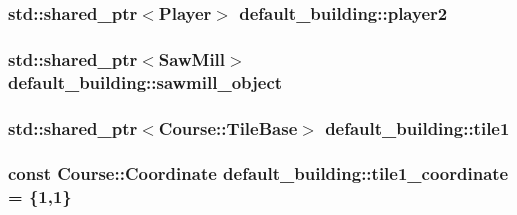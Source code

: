 \hypertarget{classdefault__building_a27f3d517ae073d9088c533a83a287ba5}{
\subsubsection[{player2}]{\setlength{\rightskip}{0pt plus 5cm}std\-::shared\-\_\-ptr$<${\bf Player}$>$ default\-\_\-building\-::player2\hspace{0.3cm}{\ttfamily [private]}}}\label{classdefault__building_a27f3d517ae073d9088c533a83a287ba5}
\hypertarget{classdefault__building_a17f72da13e6159671242ad6e31ba7fb0}{
\subsubsection[{sawmill\-\_\-object}]{\setlength{\rightskip}{0pt plus 5cm}std\-::shared\-\_\-ptr$<${\bf Saw\-Mill}$>$ default\-\_\-building\-::sawmill\-\_\-object\hspace{0.3cm}{\ttfamily [private]}}}\label{classdefault__building_a17f72da13e6159671242ad6e31ba7fb0}
\hypertarget{classdefault__building_a4851bd1b8736d29d5608dcbd85bca338}{
\subsubsection[{tile1}]{\setlength{\rightskip}{0pt plus 5cm}std\-::shared\-\_\-ptr$<${\bf Course\-::\-Tile\-Base}$>$ default\-\_\-building\-::tile1\hspace{0.3cm}{\ttfamily [private]}}}\label{classdefault__building_a4851bd1b8736d29d5608dcbd85bca338}
\hypertarget{classdefault__building_a9bf0749a6f397a82c5a939fb6fca6f43}{
\subsubsection[{tile1\-\_\-coordinate}]{\setlength{\rightskip}{0pt plus 5cm}const {\bf Course\-::\-Coordinate} default\-\_\-building\-::tile1\-\_\-coordinate = \{1,1\}\hspace{0.3cm}{\ttfamily [private]}}}\label{classdefault__building_a9bf0749a6f397a82c5a939fb6fca6f43}
